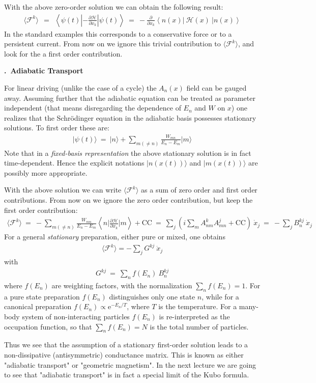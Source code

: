 \documentclass[onecolumn,fleqn, 11pt]{revtex4}
\newcommand{\eexp}{\mathrm{e}^}
\newcommand{\beq}{\begin{eqnarray}}
\newcommand{\eeq}{\end{eqnarray}}
\renewcommand{\thesubsection}{\arabic{subsection}}
\renewcommand{\thesubsubsection}{\arabic{subsubsection}}
\newcommand{\sheadC}[1]
{
\addtocounter{subsubsection}{1}
\vspace{5mm}
{\bf \thesubsection.\thesubsubsection \ #1}  
\nopagebreak
\phantomsection
}
\begin{document}
With the above zero-order solution
we can obtain the following result:
\beq
\langle \mathcal{F}^k \rangle \ \ = \ \
\left\langle  \psi(t)   
\left|-\frac{\partial \mathcal{H}}{\partial x_k}  
\right| \psi(t)  \right\rangle
\ = \ 
-\frac{\partial}{\partial x_k}
\left\langle n(x)|\ \mathcal{H}(x) \ |n(x)\right\rangle
\eeq
In the standard examples this corresponds to a conservative force 
or to a persistent current. From now on we ignore this
trivial contribution to $\langle \mathcal{F}^k \rangle$,
and look for the a first order contribution.



\sheadC{Adiabatic Transport}

For linear driving (unlike the case of a cycle) the
$A_n(x)$ field can be gauged away.
Assuming further that the adiabatic equation
can be treated as parameter independent
(that means disregarding the dependence
of $E_n$ and ${W}$ on $x$) one realizes
that the Schr\"{o}dinger equation in the adiabatic basis 
possesses stationary solutions.
To first order these are:
\beq
| \psi(t) \rangle \ = \
|n\rangle +
\sum_{m(\ne n)}
\frac{W_{mn}}
{E_n-E_m} |m\rangle
\eeq
Note that in a {\em fixed-basis representation}
the above stationary solution is in fact time-dependent.
Hence the explicit notations $|n(x(t))\rangle$ 
and $|m(x(t))\rangle$ are possibly more appropriate.


With the above solution
we can write $\langle \mathcal{F}^k \rangle$ as a sum of
zero order and first order contributions.
From now on we ignore the
zero order contribution,
but keep the first order contribution:
\beq
\langle \mathcal{F}^k \rangle 
\ = \
-\sum_{m(\ne n)}
\frac{W_{mn}}{E_n-E_m}
\left\langle n \Big|
\frac{\partial \mathcal{H}}{\partial x_k}
\Big| m \right\rangle + \mbox{CC}
\ = \ 
\sum_j \left(i\sum_{m}
A^k_{nm} A^{j}_{mn} + \mbox{CC}\right) \ \dot{x}_j
\ = \ 
-\sum_j B_n^{kj} \ \dot{x}_j
\eeq
For a general {\em stationary} preparation,
either pure or mixed, one obtains 
\beq
\langle \mathcal{F}^k \rangle = -\sum_j G^{kj} \ \dot{x}_j
\eeq
with
\beq
G^{kj} \ = \ \sum_n f(E_n) \ B_n^{kj}
\eeq
where $f(E_n)$ are weighting factors,
with the normalization $\sum_n f(E_n)=1$.
For a pure state preparation $f(E_n)$ distinguishes
only one state $n$, while for a canonical
preparation $f(E_n)\propto\eexp{-E_n/T}$,
where $T$ is the temperature.
For a many-body system of non-interacting particles 
$f(E_n)$ is re-interpreted as
the occupation function,
so that $\sum_n f(E_n)=N$ is the total
number of particles.

Thus we see that the assumption of a stationary
first-order solution leads to a non-dissipative (antisymmetric)
conductance matrix. This is known as either
"adiabatic transport" or "geometric magnetism".
In the next lecture we are going to see 
that "adiabatic transport" is in fact a special limit 
of the Kubo formula. 
\end{document}
